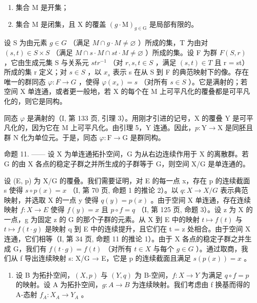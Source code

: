 \begin{enumerate}
\def\labelenumi{(\roman{enumi})}
\item
  集合 M 是开集；
\item
  集合 M 是闭集，且 X 的覆盖 \((g \cdot \mathrm{M})_{g \in \mathrm{G}}\) 是局部有限的。
\end{enumerate}

设 S 为由元素 \(g \in G\) （满足 \(M \cap g \cdot M \neq \varnothing\) ）所成的集，T 为由对 \((s, t) \in S \times S\) （满足 \(M \cap s \cdot M \cap st \cdot M \neq \varnothing\) ）所成的集。设 F 为群 \(F(S, r)\) ，它由生成元集 S 与关系元 \(str^{-1}\) （对 \(r, s, t \in S\) ，满足 \((s, t) \in T\) 且 r = st）所成的集 r 定义；对 \(s \in S\) ，以 \(x_s\) 表示 s 在从 S 到 F 的典范映射下的像。存在唯一的群同态 \(\varphi: F \to G\) ，使得 \(\varphi(x_s) = s\) （对所有 \(s \in S\) ）。它是满射的；若空间 X 单连通，或者更一般地，若 X 的每个在 M 上可平凡化的覆叠都是可平凡化的，则它是同构。

同态 \(\varphi\) 是满射的（I, 第 133 页, 引理 3）。用刚才引进的记号，X 的覆叠 Y 是可平凡化的，因为它在 M 上可平凡化。由引理 5，Y 连通。因此，\(p\colon\mathrm{Y}\to\mathrm{X}\) 是同胚且群 N 化为单位元。于是，同态 \(\varphi\colon\mathrm{F}\to\mathrm{G}\) 是群同构。

命题 11. —— 设 X 为单连通拓扑空间，G 为从右边连续作用于 X 的离散群。若 G 的由 X 各点的稳定子群之并所生成的子群等于 G，则空间 X/G 是单连通的。

设 (E, p) 为 X/G 的覆叠。我们需要证明，对 E 的每一点 x，存在 p 的连续截面 s 使得 \(s \circ p(x) = x\) （I, 第 70 页, 命题 1 的推论 2）。以 \(q: X \to X/G\) 表示典范映射，并选取 X 的一点 y 使得 \(q(y) = p(x)\) 。由于空间 X 单连通，存在连续映射 \(f: X \to E\) 使得 \(f(y) = x\) 且 \(p \circ f = q\) （I, 第 125 页, 命题 3）。设 z 为 X 的一点，g 为固定 z 的 G 的那个子群的元素。从 X 到 E 中的映射 \(t \mapsto f(t)\) 与 \(t \mapsto f(t \cdot g)\) 是映射 q 到 E 中的连续提升，且它们在 t = z 处相合。由于空间 X 连通，它们相等（I, 第 34 页, 命题 11 的推论 1）。由于 X 各点的稳定子群之并生成 G，我们有 \(f(t \cdot g) = f(t)\) （对所有 \(t \in X\) 与每个 \(g \in G\) ）。通过取商，我们从 f 导出连续映射 s: X/G → E，它是 p 的连续截面且满足 \(s(p(x)) = x\) 。


\exercisegroup

\begin{enumerate}
\def\labelenumi{\arabic{enumi})}
\tightlist
\item
  设 B 为拓扑空间，\((X,p)\) 与 \((Y,q)\) 为 B-空间，\(f\colon X\to Y\) 为满足 \(q\circ f=p\) 的映射。设 A 为拓扑空间，\(g\colon A\to B\) 为连续映射。我们考虑由 f 换基而得的 A-态射 \(f_{A}\colon X_{A}\to Y_{A}\) 。
\end{enumerate}

